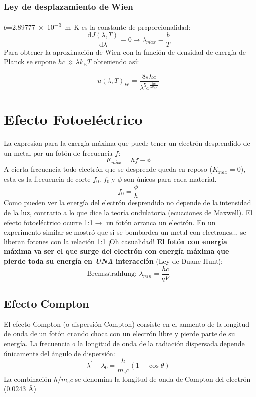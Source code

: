 \documentclass[10pt,twocolumn,titlepage]{article}
\newcommand{\boltz}{k_\textrm{B}}
\newcommand{\di}{\,\textrm{d}}
\begin{document}
\subsubsection*{Ley de desplazamiento de Wien}
$b$=\SI{2.89777e-3}{\meter \kelvin} es la constante de proporcionalidad:
$$\frac{\di J(\lambda,T)}{\di \lambda}=0\Rightarrow \lambda_{m\acute{a}x}=
\frac{b}{T}$$
Para obtener la aproximación de Wien con la función de densidad de energía de Planck se supone $hc\gg\lambda \boltz T$  obteniendo así:

$$u(\lambda,T)_\textrm{W}=\frac{8\pi hc}{\lambda^5 e^{  \frac{hc}{\lambda \boltz T} }} $$
\section{Efecto Fotoeléctrico}
La expresión para la energía máxima que puede tener un electrón desprendido de un metal por un fotón de frecuencia $f$:
$$K_{m\acute{a}x}=hf-\phi$$
A cierta frecuencia todo electrón que se desprende queda en reposo ($K_{m\acute{a}x}=0$), esta es la frecuencia de corte $f_0$. $f_0$ y $\phi$ son únicos para cada material.
$$f_0=\frac{\phi}{h} $$
Como pueden ver la energía del electrón desprendido no depende de la intensidad de la luz, contrario a lo que dice la teoría ondulatoria (ecuaciones de Maxwell). El efecto fotoeléctrico ocurre 1:1$\rightarrow$ un fotón arranca un electrón. En un experimento similar se mostró que si se bombardea un metal con electrones... se liberan fotones con la relación 1:1 ¡Oh casualidad! \textbf{El fotón con energía máxima va ser el que surge del electrón con energía máxima que pierde toda su energía en \emph{UNA} interacción} (Ley de Duane-Hunt):
$$\textrm{Bremsstrahlung:   }\lambda_{min}=\frac{hc}{qV}$$
\subsection{Efecto Compton}
El efecto Compton (o dispersión Compton) consiste en el aumento de la longitud de onda de un fotón cuando choca con un electrón libre y pierde parte de su energía. La frecuencia o la longitud de onda de la radiación dispersada depende únicamente del ángulo de dispersión:
$$\lambda ^{\prime}-\lambda_0=\frac{h}{m_ec}(1-\cos \theta) $$
La combinación $h/m_ec$ se denomina la longitud de onda de Compton del electrón ($0.0243$ \si{\angstrom}).
\end{document}
